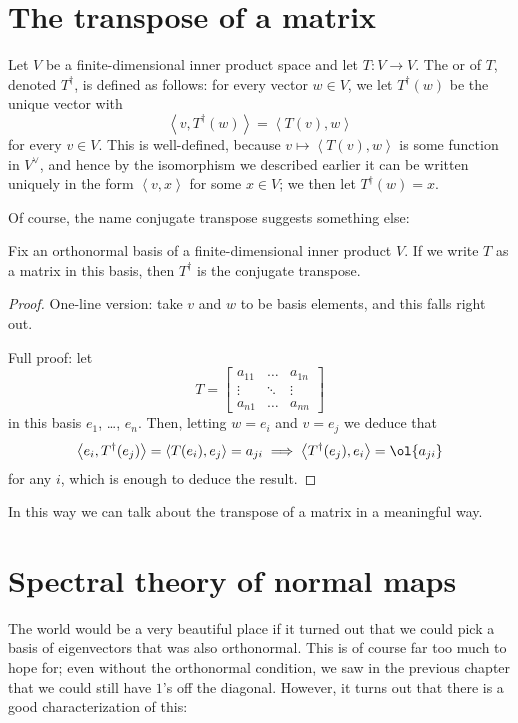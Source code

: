 \section{The transpose of a matrix}
Let $V$ be a finite-dimensional inner product space and let $T : V \to V$.
The  or  of $T$, denoted $T^\dagger$,
is defined as follows: for every vector $w \in V$, we let $T^\dagger(w)$ be the unique vector with
\[ \left< v, T^\dagger(w) \right> = \left< T(v), w \right> \]
for every $v \in V$.
This is well-defined, because $v \mapsto \left< T(v), w \right>$ is some function in $V^\vee$,
and hence by the isomorphism we described earlier it can be written uniquely in the form $\left< v, x \right>$
for some $x \in V$; we then let $T^\dagger(w) = x$.

Of course, the name conjugate transpose suggests something else:
\begin{theorem}
	Fix an orthonormal basis of a finite-dimensional inner product $V$.
	If we write $T$ as a matrix in this basis, then $T^\dagger$ is the conjugate transpose.
\end{theorem}
\begin{proof}
	One-line version: take $v$ and $w$ to be basis elements, and this falls right out.

	Full proof: let
	\[ T = \begin{bmatrix}
			a_{11} & \dots & a_{1n} \\
			\vdots & \ddots & \vdots \\
			a_{n1} & \dots & a_{nn}
		\end{bmatrix} \]
	in this basis $e_1$, \dots, $e_n$.
	Then, letting $w = e_i$ and $v = e_j$ we deduce that
	\[ \left< e_i, T^\dagger(e_j) \right> = \left< T(e_i) , e_j\right> = a_{ji}
		\implies
		\left< T^\dagger(e_j), e_i \right> = \ol{a_{ji}} \]
	for any $i$, which is enough to deduce the result.
\end{proof}

In this way we can talk about the transpose of a matrix in a meaningful way.

\section{Spectral theory of normal maps}
The world would be a very beautiful place if it turned out
that we could pick a basis of eigenvectors that was also orthonormal.
This is of course far too much to hope for; even without the orthonormal condition,
we saw in the previous chapter that we could still have $1$'s off the diagonal.
However, it turns out that there is a good characterization of this:

